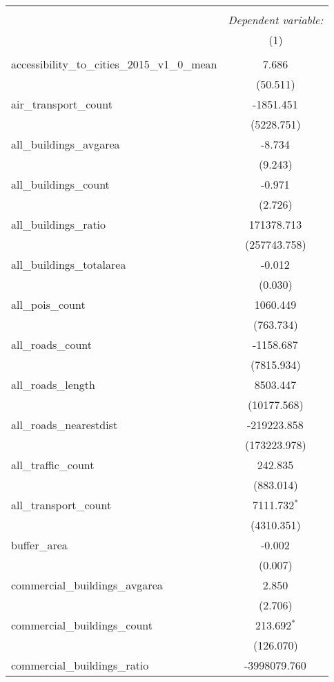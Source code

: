 \begin{table}[!htbp] \centering
\begin{tabular}{@{\extracolsep{5pt}}lc}
\\[-1.8ex]\hline
\hline \\[-1.8ex]
& \multicolumn{1}{c}{\textit{Dependent variable:}} \
\cr \cline{1-2}
\\[-1.8ex] & (1) \\
\hline \\[-1.8ex]
 accessibility_to_cities_2015_v1_0_mean & 7.686$^{}$ \\
  & (50.511) \\
 air_transport_count & -1851.451$^{}$ \\
  & (5228.751) \\
 all_buildings_avgarea & -8.734$^{}$ \\
  & (9.243) \\
 all_buildings_count & -0.971$^{}$ \\
  & (2.726) \\
 all_buildings_ratio & 171378.713$^{}$ \\
  & (257743.758) \\
 all_buildings_totalarea & -0.012$^{}$ \\
  & (0.030) \\
 all_pois_count & 1060.449$^{}$ \\
  & (763.734) \\
 all_roads_count & -1158.687$^{}$ \\
  & (7815.934) \\
 all_roads_length & 8503.447$^{}$ \\
  & (10177.568) \\
 all_roads_nearestdist & -219223.858$^{}$ \\
  & (173223.978) \\
 all_traffic_count & 242.835$^{}$ \\
  & (883.014) \\
 all_transport_count & 7111.732$^{*}$ \\
  & (4310.351) \\
 buffer_area & -0.002$^{}$ \\
  & (0.007) \\
 commercial_buildings_avgarea & 2.850$^{}$ \\
  & (2.706) \\
 commercial_buildings_count & 213.692$^{*}$ \\
  & (126.070) \\
 commercial_buildings_ratio & -3998079.760$^{}$ \\

\end{tabular}
\end{table}
